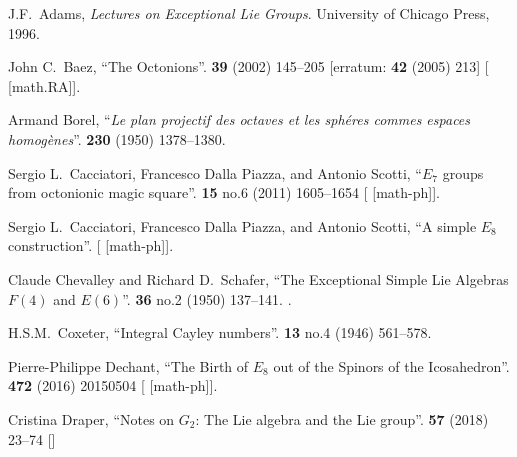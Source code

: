 \begin{thebibliography}{99}
\footnotesize%

J.F.\ Adams,
\textit{Lectures on Exceptional Lie Groups}.
University of Chicago Press, 1996.

John C.~Baez,
``The Octonions''.
 \textbf{39} (2002) 145--205
[erratum:  \textbf{42} (2005) 213]
{\tt{}}
[ [math.RA]].

Armand Borel,
``\textit{Le plan projectif des octaves et les sph\'{e}res commes espaces homog\`{e}nes}\/''. 
 \textbf{230} (1950) 1378--1380. 
  
Sergio L.~Cacciatori, Francesco Dalla Piazza, and Antonio Scotti,
``$E_7$ groups from octonionic magic square''.
 \textbf{15} no.6 (2011) 1605--1654
{\tt{}}
[ [math-ph]].

Sergio L.~Cacciatori, Francesco Dalla Piazza, and Antonio Scotti,
``A simple $E_8$ construction''.
[ [math-ph]].


Claude Chevalley and Richard D.\ Schafer, 
``The Exceptional Simple Lie Algebras $F(4)$ and $E(6)$''. 
\textbf{36} no.2 (1950) 137--141.
{\tt{}}.

H.S.M.~Coxeter,
``Integral Cayley numbers''.
 \textbf{13} no.4 (1946) 561--578.
{\tt{}}



Pierre-Philippe Dechant,
``The Birth of $E_8$ out of the Spinors of the Icosahedron''.
 \textbf{472} (2016) 20150504
{\tt{}}
[ [math-ph]].


Cristina Draper,
``Notes on $G_{2}$: The Lie algebra and the Lie group''.
\textbf{57} (2018) 23--74
{\tt{}}
[]


\end{thebibliography}
